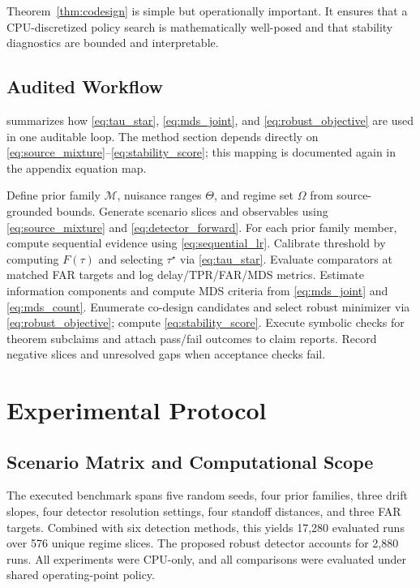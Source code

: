 \documentclass{article} %
\begin{document}
Theorem~\ref{thm:codesign} is simple but operationally important. It ensures that a CPU-discretized policy search is mathematically well-posed and that stability diagnostics are bounded and interpretable.

\subsection{Audited Workflow}
 summarizes how \eqref{eq:tau_star}, \eqref{eq:mds_joint}, and \eqref{eq:robust_objective} are used in one auditable loop. The method section depends directly on \eqref{eq:source_mixture}--\eqref{eq:stability_score}; this mapping is documented again in the appendix equation map.

\begin{algorithm}[t]
\caption{Contradiction-Aware Robust Monitoring Workflow}
\label{alg:workflow}
\begin{algorithmic}[1]
\STATE Define prior family $\mathcal{M}$, nuisance ranges $\Theta$, and regime set $\Omega$ from source-grounded bounds.
\STATE Generate scenario slices and observables using \eqref{eq:source_mixture} and \eqref{eq:detector_forward}.
\STATE For each prior family member, compute sequential evidence using \eqref{eq:sequential_lr}.
\STATE Calibrate threshold by computing $F(\tau)$ and selecting $\tau^\star$ via \eqref{eq:tau_star}.
\STATE Evaluate comparators at matched FAR targets and log delay/TPR/FAR/MDS metrics.
\STATE Estimate information components and compute MDS criteria from \eqref{eq:mds_joint} and \eqref{eq:mds_count}.
\STATE Enumerate co-design candidates and select robust minimizer via \eqref{eq:robust_objective}; compute \eqref{eq:stability_score}.
\STATE Execute symbolic checks for theorem subclaims and attach pass/fail outcomes to claim reports.
\STATE Record negative slices and unresolved gaps when acceptance checks fail.
\end{algorithmic}
\end{algorithm}

\section{Experimental Protocol}\label{sec:protocol}
\subsection{Scenario Matrix and Computational Scope}
The executed benchmark spans five random seeds, four prior families, three drift slopes, four detector resolution settings, four standoff distances, and three FAR targets. Combined with six detection methods, this yields 17,280 evaluated runs over 576 unique regime slices. The proposed robust detector accounts for 2,880 runs. All experiments were CPU-only, and all comparisons were evaluated under shared operating-point policy.
\end{document}

